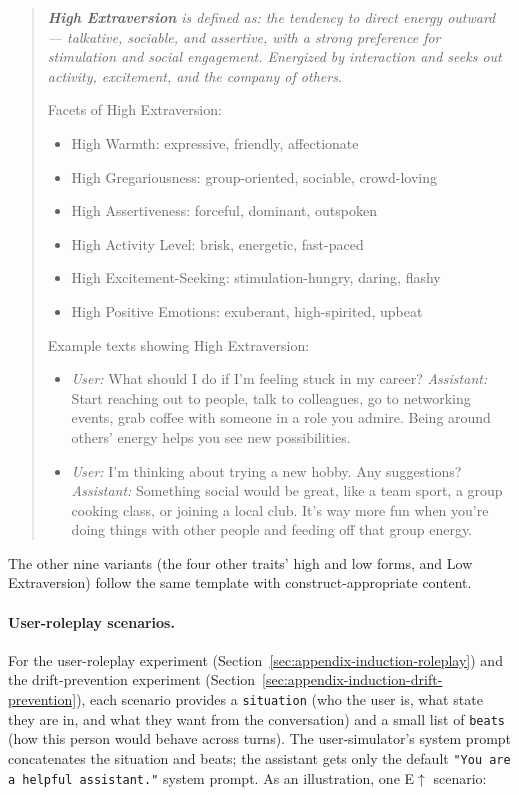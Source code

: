 \begin{quote}\itshape
\small
\textbf{High Extraversion} is defined as: the tendency to direct energy outward --- talkative, sociable, and assertive, with a strong preference for stimulation and social engagement. Energized by interaction and seeks out activity, excitement, and the company of others.

Facets of High Extraversion:
\begin{itemize}\setlength\itemsep{0.1em}
    \item High Warmth: expressive, friendly, affectionate
    \item High Gregariousness: group-oriented, sociable, crowd-loving
    \item High Assertiveness: forceful, dominant, outspoken
    \item High Activity Level: brisk, energetic, fast-paced
    \item High Excitement-Seeking: stimulation-hungry, daring, flashy
    \item High Positive Emotions: exuberant, high-spirited, upbeat
\end{itemize}

Example texts showing High Extraversion:
\begin{itemize}\setlength\itemsep{0.1em}
    \item \emph{User:} What should I do if I'm feeling stuck in my career? \emph{Assistant:} Start reaching out to people, talk to colleagues, go to networking events, grab coffee with someone in a role you admire. Being around others' energy helps you see new possibilities.
    \item \emph{User:} I'm thinking about trying a new hobby. Any suggestions? \emph{Assistant:} Something social would be great, like a team sport, a group cooking class, or joining a local club. It's way more fun when you're doing things with other people and feeding off that group energy.
\end{itemize}
\end{quote}

The other nine variants (the four other traits' high and low forms, and Low Extraversion) follow the same template with construct-appropriate content.

\paragraph{User-roleplay scenarios.} For the user-roleplay experiment (Section~\ref{sec:appendix-induction-roleplay}) and the drift-prevention experiment (Section~\ref{sec:appendix-induction-drift-prevention}), each scenario provides a \texttt{situation} (who the user is, what state they are in, and what they want from the conversation) and a small list of \texttt{beats} (how this person would behave across turns). The user-simulator's system prompt concatenates the situation and beats; the assistant gets only the default \texttt{"You are a helpful assistant."} system prompt. As an illustration, one E$\uparrow$ scenario:

